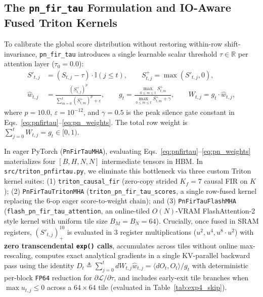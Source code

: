 \documentclass[11pt,a4paper]{article}
\begin{document}
\subsection{The \texttt{pn\_fir\_tau} Formulation and IO-Aware Fused Triton Kernels}

To calibrate the global score distribution without restoring within-row shift-invariance, \texttt{pn\_fir\_tau} introduces a single learnable scalar threshold $\tau \in \mathbb{R}$ per attention layer ($\tau_0 = 0.0$):
\begin{align}
\label{eq:pnfirtau}
S'_{t,j} &= (S_{t,j} - \tau)\cdot\mathbb{I}(j \le t), \qquad S^+_{t,j} = \max(S'_{t,j}, 0), \\
\label{eq:pn_weights}
\hat{w}_{t,j} &= \frac{(S^+_{t,j})^p}{\sum_{m=0}^{t} (S^+_{t,m})^p + \varepsilon}, \qquad g_t = \frac{\max_{0 \le m \le t} S^+_{t,m}}{\max_{0 \le m \le t} S^+_{t,m} + \gamma}, \qquad W_{t,j} = g_t \cdot \hat{w}_{t,j},
\end{align}
where $p = 10.0$, $\varepsilon = 10^{-12}$, and $\gamma = 0.5$ is the peak silence gate constant in Eqs.~\eqref{eq:pnfirtau}--\eqref{eq:pn_weights}. The total row weight is $\sum_{j=0}^{t} W_{t,j} = g_t \in [0, 1)$.

In eager PyTorch (\texttt{PnFirTauMHA}), evaluating Eqs.~\eqref{eq:pnfirtau}--\eqref{eq:pn_weights} materializes four $[B, H, N, N]$ intermediate tensors in HBM. In \texttt{src/triton\_pnfirtau.py}, we eliminate this bottleneck via three custom Triton \cite{dao2022flashattention} kernel suites: (1) \texttt{triton\_causal\_fir} (zero-copy strided $K_f=7$ causal FIR on $K$); (2) \texttt{PnFirTauTritonMHA} (\texttt{triton\_pn\_fir\_tau\_scores}, a single row-fused kernel replacing the 6-op eager score-to-weight chain); and (3) \texttt{PnFirTauFlashMHA} (\texttt{flash\_pn\_fir\_tau\_attention}, an online-tiled $O(N)$-VRAM FlashAttention-2 style kernel with uniform tile size $B_M = B_N = 64$). Crucially, once fused in SRAM registers, $(S'_{t,j})_+^{10}$ is evaluated in 3 register multiplications ($u^2, u^4, u^8 \cdot u^2$) with \textbf{zero transcendental \texttt{exp()} calls}, accumulates across tiles without online max-rescaling, computes exact analytical gradients in a single KV-parallel backward pass using the identity $D_t \triangleq \sum_{j=0}^t dW_{t,j}\hat{w}_{t,j} = \langle dO_t, O_t \rangle / g_t$ with deterministic per-block \texttt{FP64} reduction for $\partial\mathcal{L}/\partial\tau$, and includes early-exit tile branches when $\max u_{t,j} \le 0$ across a $64 \times 64$ tile (evaluated in Table~\ref{tab:exp4_skip}).
\end{document}
